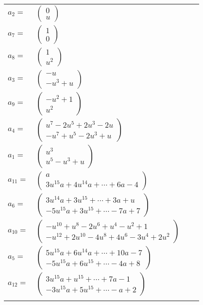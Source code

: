 \documentclass[1p]{elsarticle_modified}
\theoremstyle{definition}
\begin{document}
\begin{tabular}{m{7pt} m{180pt} m{7pt} m{180pt} }
\flushright $a_{2}=$&$\begin{pmatrix}0\\u\end{pmatrix}$ \\
\flushright $a_{7}=$&$\begin{pmatrix}1\\0\end{pmatrix}$ \\
\flushright $a_{8}=$&$\begin{pmatrix}1\\u^2\end{pmatrix}$ \\
\flushright $a_{3}=$&$\begin{pmatrix}- u\\- u^3+u\end{pmatrix}$ \\
\flushright $a_{9}=$&$\begin{pmatrix}- u^2+1\\u^2\end{pmatrix}$ \\
\flushright $a_{4}=$&$\begin{pmatrix}u^7-2 u^5+2 u^3-2 u\\- u^7+u^5-2 u^3+u\end{pmatrix}$ \\
\flushright $a_{1}=$&$\begin{pmatrix}u^3\\u^5- u^3+u\end{pmatrix}$ \\
\flushright $a_{11}=$&$\begin{pmatrix}a\\3 u^{15} a+4 u^{14} a+\cdots+6 a-4\end{pmatrix}$ \\
\flushright $a_{6}=$&$\begin{pmatrix}3 u^{14} a+3 u^{15}+\cdots+3 a+u\\-5 u^{15} a+3 u^{15}+\cdots-7 a+7\end{pmatrix}$ \\
\flushright $a_{10}=$&$\begin{pmatrix}- u^{10}+u^8-2 u^6+u^4- u^2+1\\- u^{12}+2 u^{10}-4 u^8+4 u^6-3 u^4+2 u^2\end{pmatrix}$ \\
\flushright $a_{5}=$&$\begin{pmatrix}5 u^{15} a+6 u^{14} a+\cdots+10 a-7\\-5 u^{15} a+6 u^{15}+\cdots-4 a+8\end{pmatrix}$ \\
\flushright $a_{12}=$&$\begin{pmatrix}3 u^{15} a+u^{15}+\cdots+7 a-1\\-3 u^{15} a+5 u^{15}+\cdots- a+2\end{pmatrix}$\\&\end{tabular}
\end{document}
